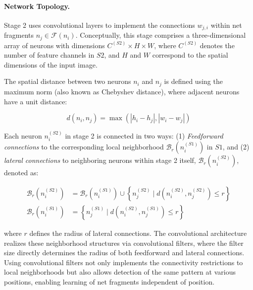 \documentclass[12pt]{article}
\begin{document}
\paragraph{Network Topology.}
Stage 2 uses convolutional layers to implement the connections $w_{j,i}$ within net fragments $n_j \in \mathcal{F}(n_i)$.
Conceptually, this stage comprises a three-dimensional array of neurons with dimensions $C^{(S2)}\times H \times W$, where $C^{(S2)}$ denotes the number of feature channels in $S2$, and $H$ and $W$ correspond to the spatial dimensions of the input image.

The spatial distance between two neurons $n_i$ and $n_j$ is defined using the maximum norm (also known as Chebyshev distance), where adjacent neurons have a unit distance:

\begin{equation}
d(n_i,n_j) = \max \left( |h_i - h_j|, |w_i - w_j|\right)
\end{equation}

Each neuron $n^{(S2)}_i$ in stage 2 is connected in two ways: (1) \emph{Feedforward connections} to the corresponding local neighborhood $\mathcal{B}_r(n^{(S1)}_i)$ in $S1$, and (2) \emph{lateral connections} to neighboring neurons within stage 2 itself, $\mathcal{B}_r(n^{(S2)}_i)$, denoted as:

\begin{equation}
\begin{aligned}
    \mathcal{B}_r \left(n^{(S2)}_i \right) &= \mathcal{B}_r \left(n^{(S1)}_i \right) \cup \left\{n_j^{(S2)} \mid d(n_i^{(S2)}, n_j^{(S2)}) \leq r \right\}\\
    \mathcal{B}_r \left(n^{(S1)}_i \right) &= \left\{n_j^{(S1)} \mid d(n_i^{(S2)}, n_j^{(S1)}) \leq r \right\}
\end{aligned}
\end{equation}

where $r$ defines the radius of lateral connections. The convolutional architecture realizes these neighborhood structures via convolutional filters, where the filter size directly determines the radius of both feedforward and lateral connections.
Using convolutional filters not only implements the connectivity restrictions to local neighborhoods but also allows detection of the same pattern at various positions, enabling learning of net fragments independent of position.
\end{document}
